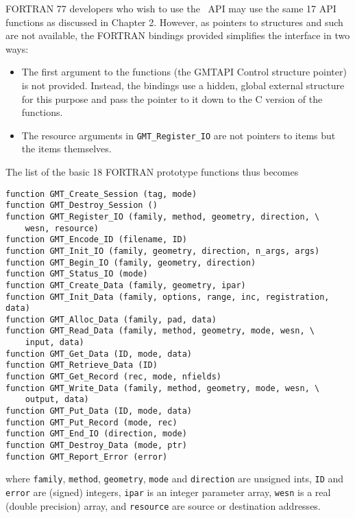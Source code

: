 \documentclass[11pt]{report}
\begin{document}
FORTRAN 77 developers who wish to use the \GMT\ API may use the same 17 API functions as discussed in Chapter 2.
However, as pointers to structures and such are not available, the FORTRAN bindings provided simplifies the
interface in two ways:
\begin{itemize}
\item The first argument to the functions (the GMTAPI Control structure pointer) is not provided.  Instead,
the bindings use a hidden, global external structure for this purpose and pass the pointer to it down to
the C version of the functions.
\item The resource arguments in \texttt{GMT\_Register\_IO} are not pointers to
items but the items themselves.
\end{itemize}
The list of the basic 18 FORTRAN prototype functions thus becomes
\begin{verbatim}
function GMT_Create_Session (tag, mode)
function GMT_Destroy_Session ()
function GMT_Register_IO (family, method, geometry, direction, \
    wesn, resource)
function GMT_Encode_ID (filename, ID)
function GMT_Init_IO (family, geometry, direction, n_args, args)
function GMT_Begin_IO (family, geometry, direction)
function GMT_Status_IO (mode)
function GMT_Create_Data (family, geometry, ipar)
function GMT_Init_Data (family, options, range, inc, registration, data)
function GMT_Alloc_Data (family, pad, data)
function GMT_Read_Data (family, method, geometry, mode, wesn, \
    input, data)
function GMT_Get_Data (ID, mode, data)
function GMT_Retrieve_Data (ID)
function GMT_Get_Record (rec, mode, nfields)
function GMT_Write_Data (family, method, geometry, mode, wesn, \
    output, data)
function GMT_Put_Data (ID, mode, data)
function GMT_Put_Record (mode, rec)
function GMT_End_IO (direction, mode)
function GMT_Destroy_Data (mode, ptr)
function GMT_Report_Error (error)
\end{verbatim}
where \texttt{family}, \texttt{method}, \texttt{geometry}, \texttt{mode} and \texttt{direction}
are unsigned ints, \texttt{ID} and \texttt{error} are (signed) integers,
\texttt{ipar} is an integer parameter array, \texttt{wesn} is a real (double precision) array,
and \texttt{resource} are source or destination addresses.

\clearpage
\printindex
\end{document}
